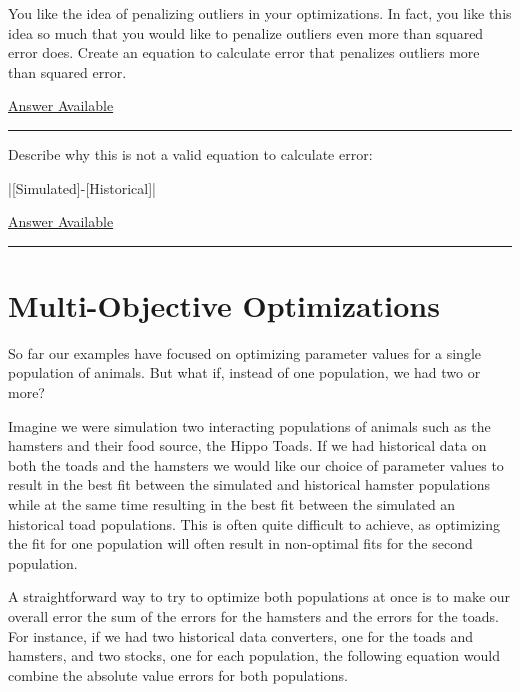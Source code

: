 \documentclass[]{memoir}
\newcommand{\NormalTok}[1]{{#1}}
\begin{document}

You like the idea of penalizing outliers in your optimizations. In fact,
you like this idea so much that you would like to penalize outliers even
more than squared error does. Create an equation to calculate error that
penalizes outliers more than squared error.

\hyperref[Ans-14-2]{Answer Available}

\begin{center}\rule{3in}{0.4pt}\end{center}


Describe why this is not a valid equation to calculate error:

|\NormalTok{[Simulated]-[Historical]}|

\hyperref[Ans-14-3]{Answer Available}

\begin{center}\rule{3in}{0.4pt}\end{center}

\section{Multi-Objective Optimizations}

So far our examples have focused on optimizing parameter values for a
single population of animals. But what if, instead of one population, we
had two or more?

Imagine we were simulation two interacting populations of animals such
as the hamsters and their food source, the Hippo Toads. If we had
historical data on both the toads and the hamsters we would like our
choice of parameter values to result in the best fit between the
simulated and historical hamster populations while at the same time
resulting in the best fit between the simulated an historical toad
populations. This is often quite difficult to achieve, as optimizing the
fit for one population will often result in non-optimal fits for the
second population.

A straightforward way to try to optimize both populations at once is to
make our overall error the sum of the errors for the hamsters and the
errors for the toads. For instance, if we had two historical data
converters, one for the toads and hamsters, and two stocks, one for each
population, the following equation would combine the absolute value
errors for both populations.
\end{document}
